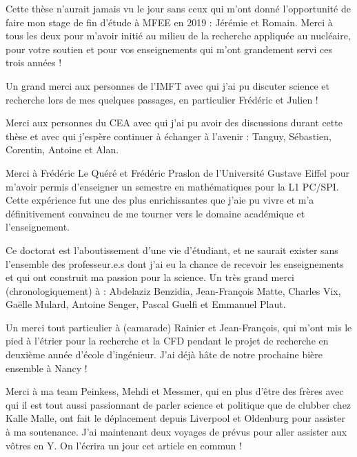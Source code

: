 \npar 

Cette thèse n'aurait jamais vu le jour sans ceux qui m'ont donné l'opportunité de faire mon stage de fin d'étude à MFEE en 2019 : Jérémie et Romain. Merci à tous les deux pour m'avoir initié au milieu de la recherche appliquée au nucléaire, pour votre soutien et pour vos enseignements qui m'ont grandement servi ces trois années !


\npar

Un grand merci aux personnes de l'IMFT avec qui j'ai pu discuter science et recherche lors de mes quelques passages, en particulier Frédéric et Julien ! 

\npar

Merci aux personnes du CEA avec qui j'ai pu avoir des discussions durant cette thèse et avec qui j'espère continuer à échanger à l'avenir : Tanguy, Sébastien, Corentin, Antoine et Alan. 

\npar

Merci à Frédéric Le Quéré et Frédéric Praslon de l'Université Gustave Eiffel pour m'avoir permis d'enseigner un semestre en mathématiques pour la L1 PC/SPI. Cette expérience fut une des plus enrichissantes que j'aie pu vivre et m'a définitivement convaincu de me tourner vers le domaine académique et l'enseignement.

\npar


Ce doctorat est l'aboutissement d'une vie d'étudiant, et ne saurait exister sans l'ensemble des professeur.e.s dont j'ai eu la chance de recevoir les enseignements et qui ont construit ma passion pour la science. Un très grand merci (chronologiquement) à : Abdelaziz Benzidia, Jean-François Matte, Charles Vix, Gaëlle Mulard, Antoine Senger, Pascal Guelfi et Emmanuel Plaut. 

\npar

Un merci tout particulier à (camarade) Rainier et Jean-François, qui m'ont mis le pied à l'étrier pour la recherche et la CFD pendant le projet de recherche en deuxième année d'école d'ingénieur. J'ai déjà hâte de notre prochaine bière ensemble à Nancy !


\npar

\npar

Merci à ma team Peinkess, Mehdi et Messmer, qui en plus d'être des frères avec qui il est tout aussi passionnant de parler science et politique que de clubber chez Kalle Malle, ont fait le déplacement depuis Liverpool et Oldenburg pour assister à ma soutenance. J'ai maintenant deux voyages de prévus pour aller assister aux vôtres en Y. On l'écrira un jour cet article en commun !

